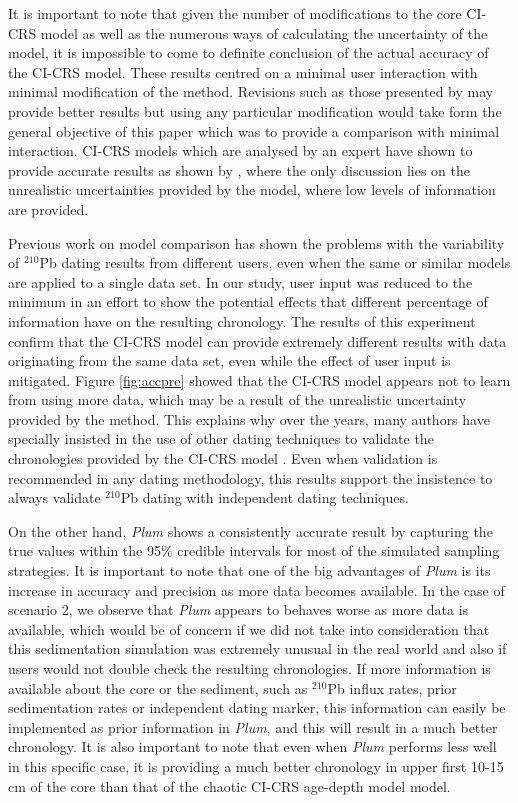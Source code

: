 \documentclass [10pt] {article}
\begin{document}
It is important to note that given the number of modifications to the core CI-CRS model as well as the numerous ways of  calculating the uncertainty of the model, it is impossible to come to definite conclusion of the actual accuracy of the CI-CRS model.
These results centred on a minimal user interaction with minimal modification of the method. 
Revisions such as those presented by \citet{Sanchez-Cabeza2012} may provide better results but using any particular modification would take form the general objective of this paper which was to provide a comparison with minimal interaction.
CI-CRS models which are analysed by an expert have shown to provide accurate results as shown by \citet{Aquino2020}, where the only discussion lies on the unrealistic uncertainties provided by the model, where low levels of information are provided.

Previous work on model comparison \citep{Barsanti2020} has shown the problems with the variability of $^{210}$Pb dating results from different users, even when the same or similar models are applied to a single data set.
In our study, user input was reduced to the minimum in an effort to show the potential effects that different percentage of information have on the resulting chronology. 
The results of this experiment confirm that the CI-CRS model can provide extremely different results with data originating from the same data set, even while the effect of user input is mitigated. 
Figure \ref{fig:accpre} showed that the CI-CRS model appears not to learn from using more data, which may be a result of the unrealistic uncertainty provided by the method.
This explains why over the years, many authors have specially insisted in the use of other dating techniques to validate the chronologies provided by the CI-CRS model \citep{Sanchez-Cabeza2012,Barsanti2020,Aquino2020}.
Even when validation is recommended in any dating methodology, this results support the insistence to always validate $^{210}$Pb dating with independent dating techniques.


On the other hand, \textit{Plum} shows a consistently accurate result by capturing the true values within the 95\% credible intervals for most of the simulated sampling strategies. 
It is important to note that one of the big advantages of \textit{Plum} is its increase in accuracy and precision as more data becomes available.
In the case of scenario 2, we observe that \textit{Plum} appears to behaves worse as more data is available, which would be of concern if we did not take into consideration that this sedimentation simulation was extremely unusual in the real world and also if users would not double check the resulting chronologies. 
If more information is available about the core or the sediment, such as $^{210}$Pb influx rates, prior sedimentation rates or independent dating marker, this information can easily be implemented as prior information in \textit{Plum}, and this will result in a much better chronology.
It is also important to note that even when \textit{Plum} performs less well in this specific case, it is providing a much better chronology in upper first 10-15 cm of the core than that of the chaotic CI-CRS age-depth model model.
\end{document}
